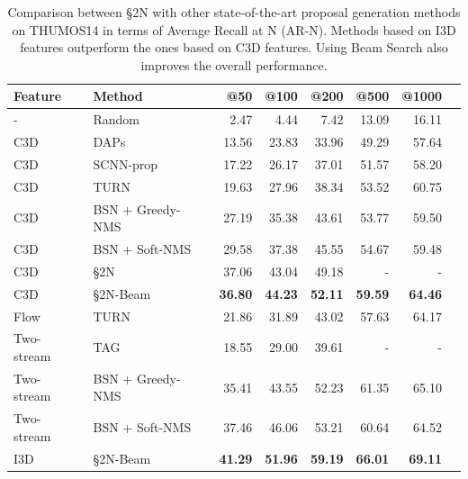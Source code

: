 \documentclass[10pt,journal,compsoc]{IEEEtran}
\begin{document}
\begin{table}
\setlength{\tabcolsep}{15pt}
\centering
\caption{Comparison between \S2N with other state-of-the-art proposal generation
methods on THUMOS14 in terms of Average Recall at N (AR-N). Methods based on I3D features outperform the ones based on C3D features. Using Beam Search also improves the overall performance. \label{results:proposal_ARAN}}
\begin{tabular}{llrrrrrr}	
\toprule
 Feature & Method & @50 & @100 & @200 & @500 &  @1000\\
\midrule
-        & Random & 2.47 & 4.44 & 7.42 & 13.09 & 16.11 \\
\midrule
C3D &  DAPs~\cite{escorcia2016daps} & 13.56 & 23.83 & 33.96 & 49.29 & 57.64 \\
C3D & SCNN-prop~\cite{caba2016fast} & 17.22 & 26.17 & 37.01 & 51.57 & 58.20 \\
C3D & TURN~\cite{Gao_2017_ICCV} & 19.63 & 27.96 & 38.34 & 53.52 & 60.75\\
C3D & BSN + Greedy-NMS ~\cite{lin2018BSN} & 27.19 & 35.38 & 43.61 & 53.77 & 59.50 \\
C3D & BSN + Soft-NMS~\cite{lin2018BSN} & 29.58 & 37.38 & 45.55 & 54.67 & 59.48 \\
\midrule
C3D & \S2N  & 37.06 & 43.04 & 49.18 & - & - \\
C3D & \S2N-Beam  & \textbf{36.80} & \textbf{44.23} & \textbf{52.11} & \textbf{59.59} & \textbf{64.46} \\
\midrule
Flow & TURN~\cite{Gao_2017_ICCV}  & 21.86 & 31.89 &  43.02 &  57.63 & 64.17 \\
Two-stream~\cite{Simonyan-Zisserman-NIPS14} & TAG~\cite{zhao2017temporal} & 18.55 & 29.00 & 39.61 & - & - \\
Two-stream~\cite{xiong2016cuhk} & BSN + Greedy-NMS~\cite{lin2018BSN} & 35.41 & 43.55 & 52.23 & 61.35 & 65.10 \\
Two-stream~\cite{xiong2016cuhk} & BSN + Soft-NMS~\cite{lin2018BSN} & 37.46 & 46.06 & 53.21 & 60.64 & 64.52 \\
I3D~\cite{carreira2017quo} & \S2N-Beam & \textbf{41.29} & \textbf{51.96} & \textbf{59.19} & \textbf{66.01} & \textbf{69.11} \\
\bottomrule
\end{tabular}
\setlength{\tabcolsep}{0.1cm}
\end{table}
\end{document}
